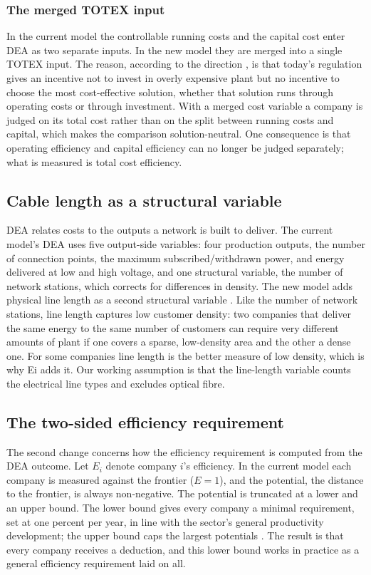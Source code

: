 \subsubsection{The merged TOTEX input}

In the current model the controllable running costs and the capital cost enter DEA as two separate
inputs. In the new model they are merged into a single TOTEX input. The reason, according to the
direction \citep[][]{Ei2025Benchmarking}, is that today's regulation gives an incentive not to
invest in overly expensive plant but no incentive to choose the most cost-effective solution,
whether that solution runs through operating costs or through investment. With a merged cost
variable a company is judged on its total cost rather than on the split between running costs and
capital, which makes the comparison solution-neutral. One consequence is that operating efficiency
and capital efficiency can no longer be judged separately; what is measured is total cost
efficiency.

\subsection{Cable length as a structural variable}

DEA relates costs to the outputs a network is built to deliver. The current model's DEA uses five output-side variables: four production outputs,
the number of connection points, the maximum subscribed/withdrawn power, and energy delivered at
low and high voltage, and one
structural variable, the number of network stations, which corrects for differences in density. The new model adds physical line length as a second structural variable
\citep{Ei2025Benchmarking}. Like the number of network stations, line length captures low customer
density: two companies that deliver the same energy to the same number of customers can require
very different amounts of plant if one covers a sparse, low-density area and the other a dense one.
For some companies line length is the better measure of low density, which is why Ei adds it. Our working assumption is that the line-length variable counts the electrical line types and excludes optical fibre.

\subsection{The two-sided efficiency requirement}

The second change concerns how the efficiency requirement is computed from the DEA outcome. Let
$E_i$ denote company $i$'s efficiency. In the current model each company is measured against the
frontier ($E = 1$), and the potential, the distance to the frontier, is always non-negative. The
potential is truncated at a lower and an upper bound. The lower bound gives every company a minimal
requirement, set at one percent per year, in line with the sector's general productivity
development; the upper bound caps the largest potentials \citep{Ei2024Bilaga9}. The result is that
every company receives a deduction, and this lower bound works in practice as a general efficiency
requirement laid on all.

